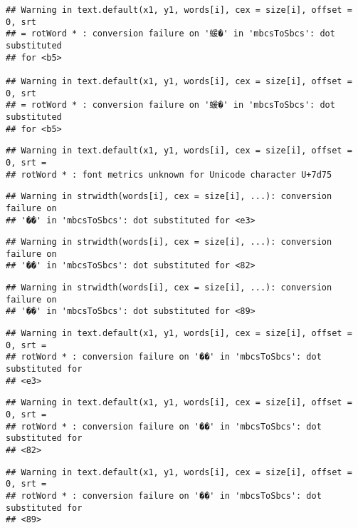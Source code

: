 \documentclass[]{article}
\begin{document}
\begin{verbatim}
## Warning in text.default(x1, y1, words[i], cex = size[i], offset = 0, srt
## = rotWord * : conversion failure on '蝯�' in 'mbcsToSbcs': dot substituted
## for <b5>

## Warning in text.default(x1, y1, words[i], cex = size[i], offset = 0, srt
## = rotWord * : conversion failure on '蝯�' in 'mbcsToSbcs': dot substituted
## for <b5>
\end{verbatim}

\begin{verbatim}
## Warning in text.default(x1, y1, words[i], cex = size[i], offset = 0, srt =
## rotWord * : font metrics unknown for Unicode character U+7d75
\end{verbatim}

\begin{verbatim}
## Warning in strwidth(words[i], cex = size[i], ...): conversion failure on
## '��' in 'mbcsToSbcs': dot substituted for <e3>
\end{verbatim}

\begin{verbatim}
## Warning in strwidth(words[i], cex = size[i], ...): conversion failure on
## '��' in 'mbcsToSbcs': dot substituted for <82>
\end{verbatim}

\begin{verbatim}
## Warning in strwidth(words[i], cex = size[i], ...): conversion failure on
## '��' in 'mbcsToSbcs': dot substituted for <89>
\end{verbatim}

\begin{verbatim}
## Warning in text.default(x1, y1, words[i], cex = size[i], offset = 0, srt =
## rotWord * : conversion failure on '��' in 'mbcsToSbcs': dot substituted for
## <e3>
\end{verbatim}

\begin{verbatim}
## Warning in text.default(x1, y1, words[i], cex = size[i], offset = 0, srt =
## rotWord * : conversion failure on '��' in 'mbcsToSbcs': dot substituted for
## <82>
\end{verbatim}

\begin{verbatim}
## Warning in text.default(x1, y1, words[i], cex = size[i], offset = 0, srt =
## rotWord * : conversion failure on '��' in 'mbcsToSbcs': dot substituted for
## <89>
\end{verbatim}
\end{document}

